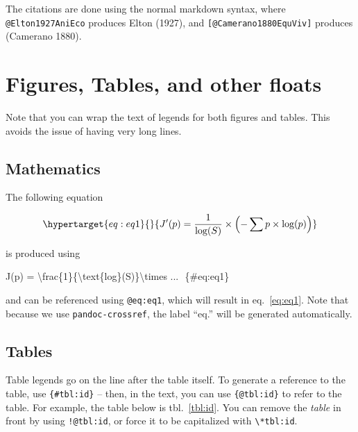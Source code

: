 \documentclass[10pt,oneside]{article}
\newenvironment{Shaded}{\begin{snugshade}}{\end{snugshade}}
\newcommand{\SpecialCharTok}[1]{\textcolor[rgb]{0.00,0.00,0.00}{#1}}
\newcommand{\SpecialStringTok}[1]{\textcolor[rgb]{0.31,0.60,0.02}{#1}}
\newcommand{\NormalTok}[1]{#1}
\begin{document}
The citations are done using the normal markdown syntax, where
\texttt{@Elton1927AniEco} produces Elton (1927), and
\texttt{{[}@Camerano1880EquViv{]}} produces (Camerano 1880).

\hypertarget{figures-tables-and-other-floats}{%
\section{Figures, Tables, and other
floats}\label{figures-tables-and-other-floats}}

Note that you can wrap the text of legends for both figures and tables.
This avoids the issue of having very long lines.

\hypertarget{mathematics}{%
\subsection{Mathematics}\label{mathematics}}

The following equation

\begin{equation}\protect\hypertarget{eq:eq1}{}{J'(p) = \frac{1}{\text{log}(S)}\times\left(-\sum p \times \text{log}(p)\right)}\label{eq:eq1}\end{equation}

is produced using

\begin{Shaded}
\begin{Highlighting}[]
\SpecialStringTok{$$J\textquotesingle{}(p) = }\SpecialCharTok{\textbackslash{}frac}\SpecialStringTok{\{1\}\{}\SpecialCharTok{\textbackslash{}text}\NormalTok{\{log\}}\SpecialStringTok{(S)\}}\SpecialCharTok{\textbackslash{}times}\SpecialStringTok{ ... $$}\NormalTok{ \{\#eq:eq1\}}
\end{Highlighting}
\end{Shaded}

and can be referenced using \texttt{@eq:eq1}, which will result in
eq.~\ref{eq:eq1}. Note that because we use \texttt{pandoc-crossref}, the
label ``eq.'' will be generated automatically.

\hypertarget{tables}{%
\subsection{Tables}\label{tables}}

Table legends go on the line after the table itself. To generate a
reference to the table, use \texttt{\{\#tbl:id\}} -- then, in the text,
you can use \texttt{\{@tbl:id\}} to refer to the table. For example, the
table below is tbl.~\ref{tbl:id}. You can remove the \emph{table} in
front by using \texttt{!@tbl:id}, or force it to be capitalized with
\texttt{\textbackslash{}*tbl:id}.
\end{document}
